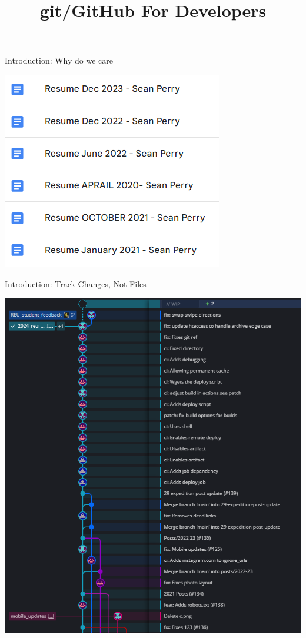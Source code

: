 \documentclass[aspectratio=169]{beamer}
\title{git/GitHub For Developers}
\institute{Engineers for Exploration, UC San Diego}
\begin{document}
\maketitle

\begin{frame}{Introduction: Why do we care}
    \begin{center}
        \includegraphics[]{why_git.png}
    \end{center}
\end{frame}

\begin{frame}{Introduction: Track Changes, Not Files}
    \begin{center}
        \includegraphics[]{git_graph.png}
    \end{center}
\end{frame}
\end{document}
